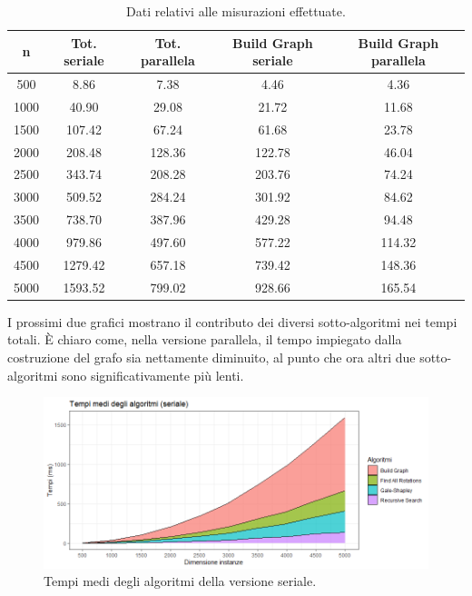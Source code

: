 \documentclass[12pt]{article}
\begin{document}
    \begin{table}[h]
    \begin{tabular}{|c|c|c|c|c|}
        \hline
        \textbf{n} & \textbf{Tot. seriale} & \textbf{Tot. parallela} & \textbf{Build Graph seriale} & \textbf{Build Graph parallela} \\
        \hline
        500 & 8.86 & 7.38 &  4.46 & 4.36 \\
        \hline
        1000 & 40.90 & 29.08 & 21.72 & 11.68 \\
        \hline
        1500 & 107.42 & 67.24 & 61.68 & 23.78 \\
        \hline
        2000 & 208.48 & 128.36 & 122.78 & 46.04 \\
        \hline
        2500 & 343.74 & 208.28 & 203.76 & 74.24 \\
        \hline
        3000 & 509.52 & 284.24 & 301.92 & 84.62 \\
        \hline
        3500 & 738.70 & 387.96 & 429.28 & 94.48 \\
        \hline
        4000 & 979.86 & 497.60 & 577.22 & 114.32 \\
        \hline
        4500 & 1279.42 & 657.18 & 739.42 & 148.36 \\
        \hline
        5000 & 1593.52 & 799.02 & 928.66 & 165.54 \\
        \hline
        \end{tabular}
    \caption{Dati relativi alle misurazioni effettuate.}
    \label{tabella3}
    \end{table}

    \FloatBarrier

    I prossimi due grafici mostrano il contributo dei diversi sotto-algoritmi nei tempi totali. È chiaro come, nella versione parallela, il tempo impiegato dalla costruzione del grafo sia nettamente diminuito, al punto che ora altri due sotto-algoritmi sono significativamente più lenti. 
        
    \begin{figure}[h]
        \includegraphics[scale=0.7]{mean_times_serial.png}
        \caption{Tempi medi degli algoritmi della versione seriale.}
        \label{fig:tempimediseriale}
    \end{figure}
\end{document}
